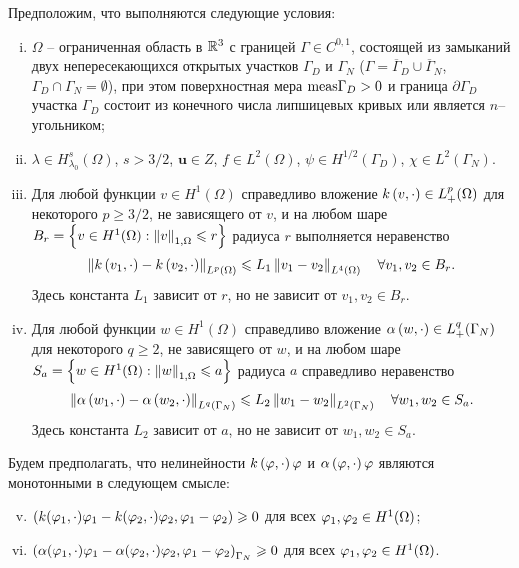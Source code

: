 Предположим, что выполняются следующие условия:
\begin{enumerate}[(i)]

	\item \label{rconds1}
		$\Omega$ -- ограниченная область в  $\mathbb{R}^3$ с границей $\Gamma \in C^{0,1}$, состоящей из замыканий двух непересекающихся открытых участков $\Gamma_D$ и $\Gamma_N$ ($\Gamma = \overline \Gamma_D \cup \overline \Gamma_N$, $\Gamma_D \cap \Gamma_N = \emptyset$), при этом поверхностная мера $\mathrm{meas}{\Gamma_D} >0$ и граница $\partial \Gamma_D$ участка $\Gamma_D$ состоит из конечного числа липшицевых кривых или является $n$--угольником;

	\item \label{rconds2}
		$\lambda \in H^{s}_{\lambda_0} (\Omega)$, $s> 3/2$, $\mathbf{u} \in Z$, $f \in L^2(\Omega)$, $\psi \in H^{1/2} (\Gamma_D)$, $\chi \in L^2 (\Gamma_N)$.

	\item \label{rconds3}
		Для любой функции $v \in H^1(\Omega)$ справедливо вложение $k \left( v, \cdot \right) \in L^{p}_{+} (\Omega)$ для некоторого $p \ge 3/2$, не зависящего от $v$, и на любом шаре $B_r = \left\lbrace 
			v \in H^1 (\Omega): \left\Vert v \right\Vert_{1,\Omega} \leqslant r 
		 \right\rbrace$ радиуса $r$ выполняется неравенство
		\[
			\left\Vert k \left( v_1, \cdot \right) - k \left( v_2, \cdot \right) \right\Vert_{L^p (\Omega)} 
			\leqslant L_1 \left\Vert v_1 - v_2 \right\Vert_{L^4(\Omega)} \quad
			\forall v_1, v_2 \in B_r.
		\]
		Здесь константа $L_1$ зависит от $r$, но не зависит от $v_1, v_2 \in B_r$.

	\item \label{rconds4}
		Для любой функции $w \in H^1(\Omega)$ справедливо вложение $\alpha \left( w, \cdot \right) \in L^{q}_{+} (\Gamma_N)$ для некоторого $q \ge 2$, не зависящего от $w$, и на любом шаре $S_a = \left\lbrace  w \in H^1 (\Omega): \left\Vert w \right\Vert_{1,\Omega} \leqslant a  \right\rbrace$ радиуса $a$ справедливо неравенство
		\[
			\left\Vert  \alpha \left( w_1, \cdot \right) - \alpha \left( w_2, \cdot \right)  \right\Vert_{L^q (\Gamma_N)} \leqslant
			L_2 \left\Vert  w_1 - w_2  \right\Vert_{L^2(\Gamma_N)} \quad \forall w_1, w_2 \in S_a.
		\]
		Здесь константа $L_2$ зависит от $a$, но не зависит от $w_1, w_2 \in S_a$.

\end{enumerate}

Будем предполагать, что нелинейности $k \left( \varphi,\cdot \right) \varphi$ и $\alpha \left( \varphi, \cdot \right) \varphi$ являются монотонными в следующем смысле:
\begin{enumerate}[(i)]
	\setcounter{enumi}{4}

	\item \label{rconds5}
		$\left(  k (\varphi_1, \cdot) \varphi_1 - k (\varphi_2, \cdot) \varphi_2, \varphi_1 - \varphi_2 \right) \geqslant 0$ для всех $\varphi_1, \varphi_2 \in H^1 (\Omega)$;

	\item \label{rconds6}
		$ \left(  \alpha (\varphi_1, \cdot) \varphi_1 - \alpha (\varphi_2, \cdot) \varphi_2, \varphi_1 - \varphi_2 \right)_{\Gamma_N} \geqslant 0$ для всех $\varphi_1, \varphi_2 \in H^1 (\Omega)$.

\end{enumerate}

